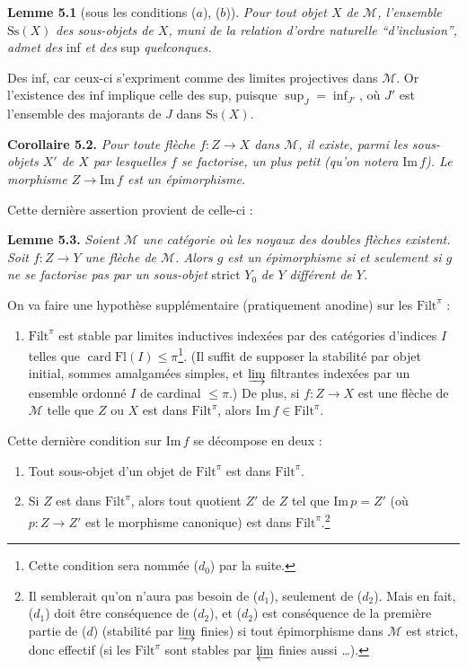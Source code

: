 \documentclass[11pt]{article}
\newcommand{\msp}[1]{\marginpar{\footnotesize [#1]}}
\newcommand{\Fl}{\mathrm{Fl}}
\newcommand{\cM}{\mathcal{M}}
\newcommand{\Filt}{\mathrm{Filt}}
\newcommand{\card}{\operatorname{card}}
\newcommand{\Ss}{\mathrm{Ss}}
\newcommand{\Img}{\mathrm{Im}\,}
\begin{document}
\textbf{Lemme 5.1} (sous les conditions ($a$), ($b$)). \textit{Pour tout objet $X$ de $\cM$, l'ensemble} $\Ss(X)$ \textit{des sous-objets de $X$, muni de la relation d'ordre naturelle ``d'inclusion'', admet des} inf \textit{et des} sup \textit{quelconques.}

Des inf, car ceux-ci s'expriment comme des limites projectives dans $\cM$. Or l'existence des inf implique celle des sup, puisque $\sup_J = \inf_{J'}$, où $J'$ est l'ensemble des majorants de $J$ dans $\Ss(X)$.

\textbf{Corollaire 5.2.} \textit{Pour toute flèche $f : Z \longrightarrow X$ dans $\cM$, il existe, parmi les sous-objets $X'$ de $X$ par lesquelles $f$ se factorise, un plus petit} %
\msp{page 45}
\textit{(qu'on notera} $\Img f$\textit{). Le morphisme $Z \longrightarrow \Img f$ est un épimorphisme.}

Cette dernière assertion provient de celle-ci :

\textbf{Lemme 5.3.} \textit{Soient $\cM$ une catégorie où les noyaux des doubles flèches existent. Soit $f : Z \longrightarrow Y$ une flèche de $\cM$. Alors $g$ est un épimorphisme si et seulement si $g$ ne se factorise pas par un sous-objet} strict $Y_0$ \textit{de $Y$ différent de $Y$.} %

On va faire une hypothèse supplémentaire (pratiquement anodine) sur les $\Filt^{\pi}$ :

\begin{enumerate}[nosep]
\item[\textit{d})] $\Filt^{\pi}$ est stable par limites inductives indexées par des catégories d'indices $I$ telles que $\card \Fl(I) \leq \pi$\footnote[16]{Cette condition sera nommée ($d_0$) par la suite.}. (Il suffit de supposer la stabilité par objet initial, sommes amalgamées simples, et $\varinjlim$ filtrantes indexées par un ensemble ordonné $I$ de cardinal $\leq \pi$.) De plus, si $f : Z \longrightarrow X$ est une flèche de $\cM$ telle que $Z$ ou $X$ est dans $\Filt^{\pi}$, alors $\Img f \in \Filt^{\pi}$.
\end{enumerate}

Cette dernière condition sur $\Img f$ se décompose en deux :
\msp{page 46}

\begin{enumerate}[nosep]
\item[$d_1$)] Tout sous-objet d'un objet de $\Filt^{\pi}$ est dans $\Filt^{\pi}$.
\item[$d_2$)] Si $Z$ est dans $\Filt^{\pi}$, alors tout quotient $Z'$ de $Z$ tel que $\Img p = Z'$ (où $p : Z \longrightarrow Z'$ est le morphisme canonique) est dans $\Filt^{\pi}$.\footnote[17]{Il semblerait qu'on n'aura pas besoin de ($d_1$), seulement de ($d_2$). Mais en fait, ($d_1$) doit être conséquence de ($d_2$), et ($d_2$) est conséquence de la première partie de ($d$) (stabilité par $\varinjlim$ finies) si tout épimorphisme dans $\cM$ est strict, donc effectif (si les $\Filt^{\pi}$ sont stables par $\varprojlim$ finies aussi \ldots).}
\end{enumerate}
\end{document}
